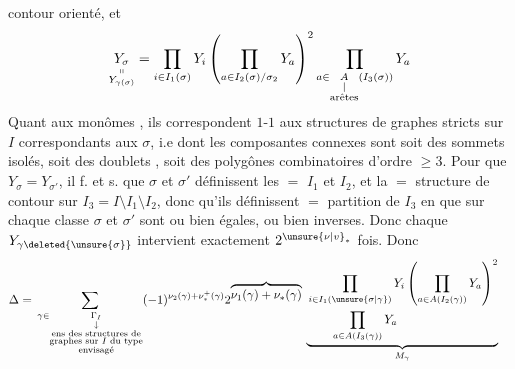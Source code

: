 contour orienté, et
\[
\underset{\substack{\shortparallel\\Y_{\gamma(\sigma)}}}{Y_\sigma}
=\prod_{i\in I_1(\sigma)}Y_i
\left(\prod_{a\in I_2(\sigma)/\sigma_2}Y_a\right)^2
\prod_{a\in\underset{\substack{|\\\text{arêtes}}}{A}(I_3(\sigma))}Y_a
\]
Quant aux monômes , ils correspondent $1$-$1$ aux structures de graphes  stricts \inserted{$\gamma$} sur $I$ correspondants aux $\sigma$, i.e dont les composantes connexes sont soit des sommets isolés, soit des  doublets
, soit des polygônes combinatoires d'ordre  $\geq3$. Pour que $Y_\sigma=Y_{\sigma'}$, il f. et s.  que $\sigma$ et $\sigma'$ définissent les $=$ $I_1$ et $I_2$, et  la $=$ structure  de contour sur $I_3=I\setminus I_1\setminus I_2$, donc qu'ils  définissent $=$ partition de $I_3$ en   que sur chaque classe $\sigma$ et $\sigma'$ sont ou bien égales, ou bien inverses. Donc chaque $Y_{\gamma\deleted{\unsure{\sigma}}}$ intervient exactement $2^{\unsure{\nu|v}_*}$ fois. Donc
\[
\begin{aligned}
\Delta={}&\sum_{\gamma\in\underset{\substack{\downarrow\\\text{ens des structures de}\\\text{graphes sur }I\text{ du type}\\\text{envisagé}}}{\Gamma_I}}
(-1)^{\nu_2(\gamma)+\nu_*^+(\gamma)}
2^{\overbrace{\nu_1(\gamma)+\nu_*(\gamma)}}\,
\underbrace{\begin{aligned}
&\prod_{i\in I_1(\unsure{\sigma|\gamma})}Y_i
\left(\prod_{a\in A(I_2(\gamma))}Y_a\right)^2\\
&\qquad\prod_{a\in A(I_3(\gamma))}Y_a
\end{aligned}}_{M_\gamma}
\end{aligned}
\]

